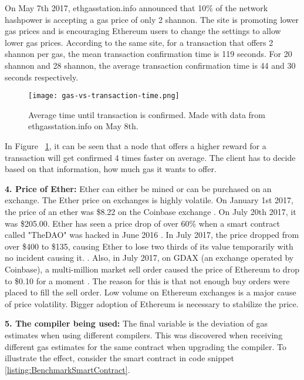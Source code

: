 On May 7th 2017, ethgasstation.info announced \cite{ETHGasStationAnnouncement} that 10\% of the network hashpower is accepting a gas price of only 2 shannon. The site is promoting lower gas prices and is encouraging Ethereum users to change the settings to allow lower gas prices. According to the same site, for a transaction that offers 2 shannon per gas, the mean transaction confirmation time is 119 seconds. For 20 shannon and 28 shannon, the average transaction confirmation time is 44 and 30 seconds respectively.

\begin{figure}[H]
\centering
\texttt{[image: gas-vs-transaction-time.png]}
\caption{Average time until transaction is confirmed. Made with data from ethgasstation.info on May 8th.}
\label{fig:gas}
\end{figure}

In Figure ~\ref{fig:gas}, it can be seen that a node that offers a higher reward for a transaction will get confirmed 4 times faster on average. The client has to decide based on that information, how much gas it wants to offer.

\textbf{4. Price of Ether:} Ether can either be mined or can be purchased on an exchange. The Ether price on exchanges is highly volatile. On January 1st 2017, the price of an ether was \$8.22 on the Coinbase exchange \cite{Coinbase}. On July 20th 2017, it was \$205.00. Ether has seen a price drop of over 60\% when a smart contract called "TheDAO" was hacked in June 2016 \cite{DAO}. In July 2017, the price dropped from over \$400 to \$135, causing Ether to lose two thirds of its value temporarily with no incident causing it. \cite{Coinbase}. Also, in July 2017, on GDAX (an exchange operated by Coinbase), a multi-million market sell order caused the price of Ethereum to drop to \$0.10 for a moment \cite{EthereumCent}. The reason for this is that not enough buy orders were placed to fill the sell order. Low volume on Ethereum exchanges is a major cause of price volatility. Bigger adoption of Ethereum is necessary to stabilize the price.

\textbf{5. The compiler being used:} The final variable is the deviation of gas estimates when using different compilers. This was discovered when receiving different gas estimates for the same contract when upgrading the compiler. To illustrate the effect, consider the smart contract in code snippet \ref{listing:BenchmarkSmartContract}.



